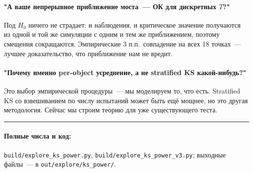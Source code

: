 \documentclass[11pt]{article}
\begin{document}
\paragraph{"А ваше непрерывное приближение моста~--- ОК для дискретных $T$?"}
Под $H_0$ ничего не страдает: и наблюдения, и критическое значение получаются из одной и той же симуляции с одним и тем же приближением, поэтому смещения сокращаются. Эмпирические 3 п.п.\ совпадение на всех 18 точках~--- лучшее доказательство, что приближение нам не вредит.

\paragraph{"Почему именно per-object усреднение, а не stratified KS какой-нибудь?"}
Это выбор эмпирической процедуры~--- мы моделируем то, что есть. Stratified KS со взвешиванием по числу испытаний может быть ещё мощнее, но это другая методология. Сейчас мы строим теорию для уже существующего теста.

\bigskip
\begin{center}\rule{0.4\textwidth}{0.4pt}\end{center}

\paragraph{Полные числа и код:} \texttt{build/explore\_ks\_power.py},  \texttt{build/explore\_ks\_power\_v3.py}; выходные файлы~--- в \texttt{out/explore/ks\_power/}.
\end{document}
